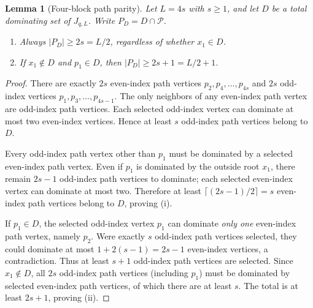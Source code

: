 \documentclass[11pt,a4paper]{article}
\newtheorem{lemma}[theorem]{Lemma}
\theoremstyle{definition}
\theoremstyle{remark}
\begin{document}
\begin{lemma}[Four-block path parity]\label{lem:path}
Let $L=4s$ with $s\ge1$, and let $D$ be a total dominating set of $J_{q,L}$. Write $P_D=D\cap\mathcal P$.
\begin{enumerate}[label=(\roman*)]
\item Always $|P_D|\ge2s=L/2$, regardless of whether $x_1\in D$.
\item If $x_1\notin D$ and $p_1\in D$, then $|P_D|\ge2s+1=L/2+1$.
\end{enumerate}
\end{lemma}
\begin{proof}
There are exactly $2s$ even-index path vertices $p_2,p_4,\ldots,p_{4s}$ and $2s$ odd-index vertices $p_1,p_3,\ldots,p_{4s-1}$. The only neighbors of any even-index path vertex are odd-index path vertices. Each selected odd-index vertex can dominate at most two even-index vertices. Hence at least $s$ odd-index path vertices belong to $D$.

Every odd-index path vertex other than $p_1$ must be dominated by a selected even-index path vertex. Even if $p_1$ is dominated by the outside root $x_1$, there remain $2s-1$ odd-index path vertices to dominate; each selected even-index vertex can dominate at most two. Therefore at least $\lceil(2s-1)/2\rceil=s$ even-index path vertices belong to $D$, proving (i).

If $p_1\in D$, the selected odd-index vertex $p_1$ can dominate \emph{only one} even-index path vertex, namely $p_2$. Were exactly $s$ odd-index path vertices selected, they could dominate at most $1+2(s-1)=2s-1$ even-index vertices, a contradiction. Thus at least $s+1$ odd-index path vertices are selected. Since $x_1\notin D$, all $2s$ odd-index path vertices (including $p_1$) must be dominated by selected even-index path vertices, of which there are at least $s$. The total is at least $2s+1$, proving (ii).
\end{proof}
\end{document}
